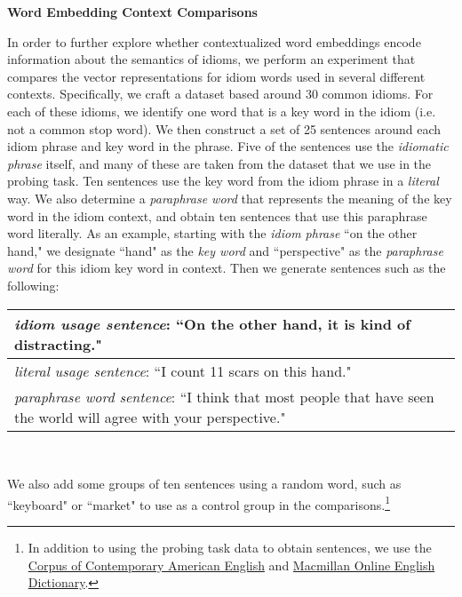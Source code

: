 \documentclass[11pt,a4paper]{article}
\begin{document}
\vspace{2mm}
\noindent \textbf{Word Embedding Context Comparisons}

\noindent In order to further explore whether contextualized word embeddings encode information about the semantics of idioms, we perform an experiment that compares the vector representations for idiom words used in several different contexts. Specifically, we craft a dataset based around 30 common idioms. For each of these idioms, we identify one word that is a key word in the idiom (i.e. not a common stop word). We then construct a set of 25 sentences around each idiom phrase and key word in the phrase. Five of the sentences use the \textit{idiomatic phrase} itself, and many of these are taken from the dataset that we use in the probing task. Ten sentences use the key word from the idiom phrase in a \textit{literal} way. We also determine a \textit{paraphrase word} that represents the meaning of the key word in the idiom context, and obtain ten sentences that use this paraphrase word literally. As an example, starting with the \textit{idiom phrase} ``on the other hand," we designate  ``hand" as the \textit{key word} and ``perspective" as the \textit{paraphrase word} for this idiom key word in context. Then we generate sentences such as the following:

\vspace{1mm}

\begin{small}
\noindent\begin{tabular}{|p{\linewidth}|}
\hline
\textit{idiom usage sentence}: ``On the other hand, it is kind of distracting." \\\hline
\textit{literal usage sentence}: ``I count 11 scars on this hand." \\\hline
 \textit{paraphrase word sentence}: ``I think that most people that have seen the world will agree with your perspective." \\\hline
\end{tabular}\\
\end{small}

 We also add some groups of ten sentences using a random word, such as ``keyboard" or ``market" to use as a control group in the comparisons.\footnote{In addition to using the probing task data to obtain sentences, we use the \href{https://www.english-corpora.org/coca/}{Corpus of Contemporary American English} and  \href{https://www.macmillandictionary.com/us/}{Macmillan Online English Dictionary}.}
\end{document}
